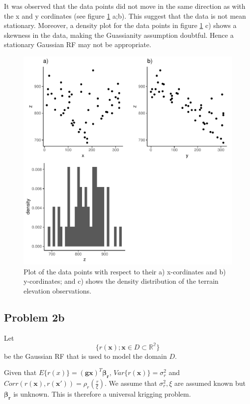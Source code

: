 \documentclass[]{article}
\newcommand{\vect}[1]{\ensuremath{\boldsymbol{\mathbf{#1}}}}
\begin{document}
It was observed that the data points did not move in the same direction
as with the x and y cordinates (see figure \ref{fig:fig2} a;b). This
suggest that the data is not mean stationary. Moreover, a density plot
for the data points in figure \ref{fig:fig2} c) shows a skewness in the
data, making the Guassianity assumption doubtful. Hence a stationary
Gaussian RF may not be appropriate.

\begin{figure}
\centering
\includegraphics{Exercise-1_files/figure-latex/fig2-1.pdf}
\caption{\label{fig:fig2} Plot of the data points with respect to their
a) x-cordinates and b) y-cordinates; and c) shows the density
distribution of the terrain elevation observations.}
\end{figure}

\hypertarget{problem-2b}{%
\subsection{Problem 2b}\label{problem-2b}}

Let \[
\{r (\vect{x}); \vect{x} \in D \subset \mathbb{R^2}\}
\] be the Gaussian RF that is used to model the domain \(D\).

Given that \(E\{r(x)\} = (\vect{gx})^T \vect{\beta_r}\),
\(Var\{r(\vect{x})\} = \sigma_r^2\) and
\(Corr(r(\vect{x}), r(\vect{x'})) = \rho_r(\frac{\tau}{\xi})\). We
assume that \(\sigma_r^2, \xi\) are assumed known but \(\vect{\beta_r}\)
is unknown. This is therefore a universal krigging problem.
\end{document}
